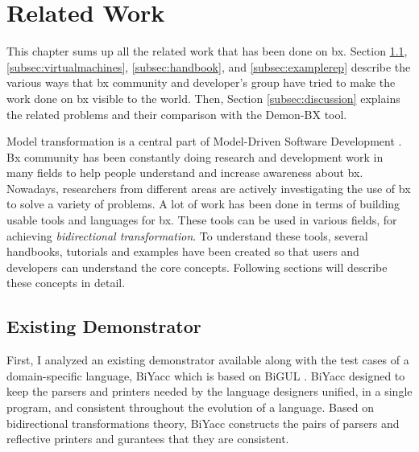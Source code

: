 \section{Related Work}\label{sec:relatedwork}
This chapter sums up all the related work that has been done on bx. Section \ref{subsec:existingdemo}, \ref{subsec:virtualmachines}, \ref{subsec:handbook}, and \ref{subsec:examplerep} describe the various ways that bx community and developer's group have tried to make the work done on bx visible to the world. Then, Section \ref{subsec:discussion} explains the related problems and their comparison with the Demon-BX tool. 

Model transformation is a central part of Model-Driven Software Development \cite{bx-grace} \cite{bx-dagstuhl}. Bx community has been constantly doing research and development work in many fields to help people understand and increase awareness about bx. Nowadays, researchers from different areas are actively investigating the use of bx to solve a variety of problems. A lot of work has been done in terms of building usable tools and languages for bx. These tools can be used in various fields, for achieving \textit{bidirectional transformation}. To understand these tools, several handbooks, tutorials and examples have been created so that users and developers can understand the core concepts. Following sections will describe these concepts in detail.

\subsection{Existing Demonstrator}\label{subsec:existingdemo}
First, I analyzed an existing demonstrator available along with the test cases of a domain-specific language, BiYacc \cite{biyacc} which is based on BiGUL \cite{bigul}. BiYacc designed to keep the parsers and printers needed by the language designers unified, in a single program, and consistent throughout the evolution of a language. Based on bidirectional transformations theory, BiYacc constructs the pairs of parsers and reflective printers and gurantees that they are consistent.

